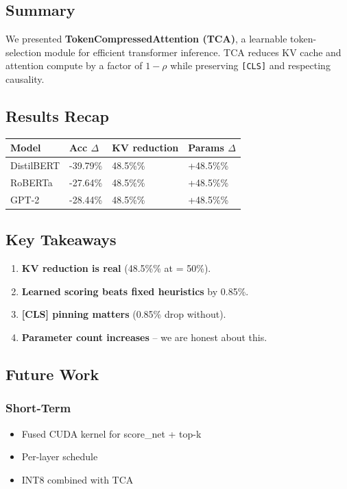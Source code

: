 \subsection{Summary}

We presented \textbf{TokenCompressedAttention (TCA)}, a learnable token-selection 
module for efficient transformer inference. TCA reduces KV cache and 
attention compute by a factor of $1 - \rho$ while preserving \texttt{[CLS]} and 
respecting causality.

\subsection{Results Recap}

\begin{table}[H]
\centering
\small
\begin{tabular}{llll}
\toprule
\textbf{Model} & \textbf{Acc $\Delta$} & \textbf{KV reduction} & \textbf{Params $\Delta$} \\
\midrule
DistilBERT & -39.79\% & 48.5\%\% & +48.5\%\% \\
RoBERTa & -27.64\% & 48.5\%\% & +48.5\%\% \\
GPT-2 & -28.44\% & 48.5\%\% & +48.5\%\% \\
\bottomrule
\end{tabular}
\end{table}

\subsection{Key Takeaways}

\begin{enumerate}
\item \textbf{KV reduction is real} (48.5\%\% at   = 50\%).
\item \textbf{Learned scoring beats fixed heuristics} by 0.85\%.
\item \textbf{[CLS] pinning matters} (0.85\% drop without).
\item \textbf{Parameter count increases} -- we are honest about this.

\end{enumerate}
\subsection{Future Work}

\subsubsection{Short-Term}
\begin{itemize}
\item Fused CUDA kernel for score\_net + top-k
\item Per-layer   schedule
\item INT8 combined with TCA

\end{itemize}
